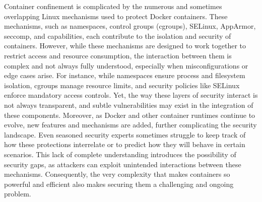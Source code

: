 Container confinement is complicated by the numerous and sometimes overlapping Linux mechanisms used to protect Docker containers. These mechanisms, such as namespaces, control groups (cgroups), SELinux, AppArmor, seccomp, and capabilities, each contribute to the isolation and security of containers. However, while these mechanisms are designed to work together to restrict access and resource consumption, the interaction between them is complex and not always fully understood, especially when misconfigurations or edge cases arise. For instance, while namespaces ensure process and filesystem isolation, cgroups manage resource limits, and security policies like SELinux enforce mandatory access controls. Yet, the way these layers of security interact is not always transparent, and subtle vulnerabilities may exist in the integration of these components. Moreover, as Docker and other container runtimes continue to evolve, new features and mechanisms are added, further complicating the security landscape. Even seasoned security experts sometimes struggle to keep track of how these protections interrelate or to predict how they will behave in certain scenarios. This lack of complete understanding introduces the possibility of security gaps, as attackers can exploit unintended interactions between these mechanisms. Consequently, the very complexity that makes containers so powerful and efficient also makes securing them a challenging and ongoing problem.


